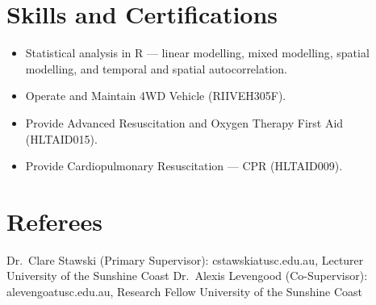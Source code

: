 \documentclass[
]{article}
\providecommand{\tightlist}{%
  \setlength{\itemsep}{0pt}\setlength{\parskip}{0pt}}
\begin{document}
\section{Skills and Certifications}\label{skills-and-certifications}

\begin{itemize}
\tightlist
\item
  Statistical analysis in R --- linear modelling, mixed modelling,
  spatial modelling, and temporal and spatial autocorrelation.
\item
  Operate and Maintain 4WD Vehicle (RIIVEH305F).
\item
  Provide Advanced Resuscitation and Oxygen Therapy First Aid
  (HLTAID015).
\item
  Provide Cardiopulmonary Resuscitation --- CPR (HLTAID009).
\end{itemize}

\section{Referees}\label{referees}

Dr.~Clare Stawski (Primary Supervisor): cstawskiatusc.edu.au, Lecturer
University of the Sunshine Coast Dr.~Alexis Levengood (Co-Supervisor):
alevengoatusc.edu.au, Research Fellow University of the Sunshine Coast
\end{document}
